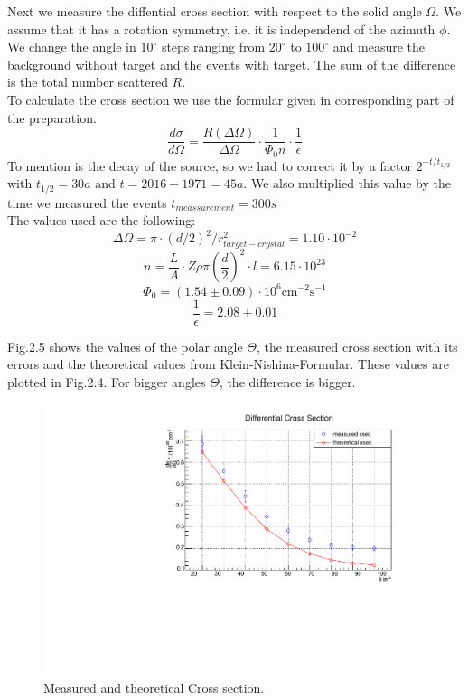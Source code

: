 Next we measure the diffential cross section with respect to the solid angle $\Omega$. We assume that it has a rotation symmetry, i.e. it is independend of the azimuth $\phi$.\\
We change the angle in $10 ^{\circ}$ steps ranging from $20 ^{\circ}$ to $100 ^{\circ}$ and measure the background without target and the events with target. The sum of the difference is the total number scattered $R$. \\
To calculate the cross section we use the formular given in corresponding part of the preparation. 
$$\frac{d\sigma}{d\Omega} = \frac{R(\Delta \Omega)}{\Delta \Omega} \cdot \frac{1}{\Phi _0 n} \cdot \frac{1}{\epsilon} $$
To mention is the decay of the source, so we had to correct it by a factor $2^{-t/t_{1/2}}$ with $t_{1/2} = 30a$ and $t = 2016 - 1971 = 45a$. We also multiplied this value by the time we measured the events $t_{meassurement} = 300s$\\
The values used are the following:
$$ \Delta \Omega = \pi \cdot (d/2)^{2} / r^{2}_{target-crystal} = 1.10 \cdot 10^{-2}$$
$$n =  \frac{L}{A} \cdot Z \rho \pi (\frac{d}{2})^{2} \cdot l = 6.15 \cdot 10^{23}$$
$$\Phi_0 = (1.54 \pm 0.09) \cdot 10^{6} \mathrm{cm}^{-2} \mathrm{s}^{-1} $$
$$\frac{1}{\epsilon} = 2.08 \pm 0.01$$

Fig.2.5 shows the values of the polar angle $\Theta$, the measured cross section with its errors and the theoretical values from Klein-Nishina-Formular. These values are plotted in Fig.2.4. For bigger angles $\Theta$, the difference is bigger.\\

\newpage

\begin{figure}[h]
\centering
\includegraphics[scale=0.5]{./../plots/xs.pdf}
\caption{Measured and theoretical Cross section.}
\end{figure}

